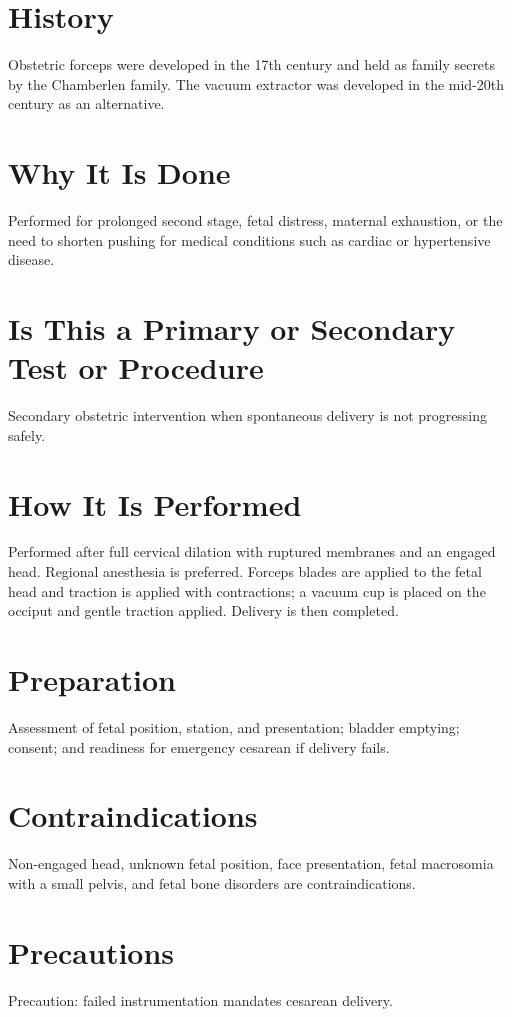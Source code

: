 \section*{History}
Obstetric forceps were developed in the 17th century and held as family secrets by the Chamberlen family. The vacuum extractor was developed in the mid-20th century as an alternative.

\section*{Why It Is Done}
Performed for prolonged second stage, fetal distress, maternal exhaustion, or the need to shorten pushing for medical conditions such as cardiac or hypertensive disease.

\section*{Is This a Primary or Secondary Test or Procedure}
Secondary obstetric intervention when spontaneous delivery is not progressing safely.

\section*{How It Is Performed}
Performed after full cervical dilation with ruptured membranes and an engaged head. Regional anesthesia is preferred. Forceps blades are applied to the fetal head and traction is applied with contractions; a vacuum cup is placed on the occiput and gentle traction applied. Delivery is then completed.

\section*{Preparation}
Assessment of fetal position, station, and presentation; bladder emptying; consent; and readiness for emergency cesarean if delivery fails.

\section*{Contraindications}
Non-engaged head, unknown fetal position, face presentation, fetal macrosomia with a small pelvis, and fetal bone disorders are contraindications.

\section*{Precautions}
Precaution: failed instrumentation mandates cesarean delivery.

